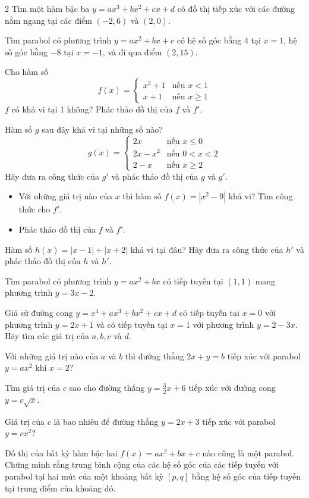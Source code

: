 \begin{multicols}{2}
 Tìm một hàm bậc ba $y = ax^3 + bx^2 + cx + d$ có đồ thị tiếp xúc với các đường nằm ngang tại các điểm $(-2, 6)$ và $(2, 0)$.

 Tìm parabol có phương trình $y = ax^2 + bx + c$ có hệ số góc bằng 4 tại $x = 1$, hệ số góc bằng $-8$ tại $x = -1$, và đi qua điểm $(2, 15)$.

 Cho hàm số
\[
f(x) = \begin{cases}
x^2 + 1 & \text{nếu } x < 1 \\
x + 1 & \text{nếu } x \ge 1
\end{cases}
\]
$f$ có khả vi tại 1 không? Phác thảo đồ thị của $f$ và $f'$.

 Hàm số $g$ sau đây khả vi tại những số nào?
\[
g(x) = \begin{cases}
2x & \text{nếu } x \le 0 \\
2x - x^2 & \text{nếu } 0 < x < 2 \\
2 - x & \text{nếu } x \ge 2
\end{cases}
\]
Hãy đưa ra công thức của $g'$ và phác thảo đồ thị của $g$ và $g'$.

\begin{itemize}[leftmargin=1.5em, itemsep=2pt, topsep=2pt, parsep=0pt]
  \item[(a)] Với những giá trị nào của $x$ thì hàm số $f(x) = |x^2 - 9|$ khả vi? Tìm công thức cho $f'$.
  \item[(b)] Phác thảo đồ thị của $f$ và $f'$.
\end{itemize}

 Hàm số $h(x) = |x - 1| + |x + 2|$ khả vi tại đâu? Hãy đưa ra công thức của $h'$ và phác thảo đồ thị của $h$ và $h'$.

 Tìm parabol có phương trình $y = ax^2 + bx$ có tiếp tuyến tại $(1, 1)$ mang phương trình $y = 3x - 2$.

 Giả sử đường cong $y = x^4 + ax^3 + bx^2 + cx + d$ có tiếp tuyến tại $x = 0$ với phương trình $y = 2x + 1$ và có tiếp tuyến tại $x = 1$ với phương trình $y = 2 - 3x$. Hãy tìm các giá trị của $a, b, c$ và $d$.

 Với những giá trị nào của $a$ và $b$ thì đường thẳng $2x + y = b$ tiếp xúc với parabol $y = ax^2$ khi $x = 2$?

 Tìm giá trị của $c$ sao cho đường thẳng $y = \frac{3}{2}x + 6$ tiếp xúc với đường cong $y = c\sqrt{x}$.

 Giá trị của $c$ là bao nhiêu để đường thẳng $y = 2x + 3$ tiếp xúc với parabol $y = cx^2$?

 Đồ thị của bất kỳ hàm bậc hai $f(x) = ax^2 + bx + c$ nào cũng là một parabol. Chứng minh rằng trung bình cộng của các hệ số góc của các tiếp tuyến với parabol tại hai mút của một khoảng bất kỳ $[p, q]$ bằng hệ số góc của tiếp tuyến tại trung điểm của khoảng đó.

\end{multicols}

\vfill
{}
